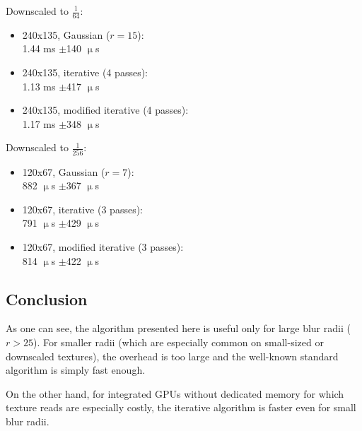 \documentclass[english,fleqn,10pt,twocolumn]{article}
\begin{document}
Downscaled to $\frac 1{64}$:
\begin{itemize}
    \item 240x135, Gaussian ($r = 15$): \\
        1.44 ms $\pm$140 $\upmu$s
    \item 240x135, iterative (4 passes): \\
        1.13 ms $\pm$417 $\upmu$s
    \item 240x135, modified iterative (4 passes): \\
        1.17 ms $\pm$348 $\upmu$s
\end{itemize}

Downscaled to $\frac 1{256}$:
\begin{itemize}
    \item 120x67, Gaussian ($r = 7$): \\
        882 $\upmu$s $\pm$367 $\upmu$s
    \item 120x67, iterative (3 passes): \\
        791 $\upmu$s $\pm$429 $\upmu$s
    \item 120x67, modified iterative (3 passes): \\
        814 $\upmu$s $\pm$422 $\upmu$s
\end{itemize}

\newpage

\subsection{Conclusion}

As one can see, the algorithm presented here is useful only for large blur radii ($r > 25$). For smaller radii (which are especially common on small-sized or downscaled textures), the overhead is too
large and the well-known standard algorithm is simply fast enough.

On the other hand, for integrated GPUs without dedicated memory for which texture reads are especially costly, the iterative algorithm is faster even for small blur radii.
\end{document}

